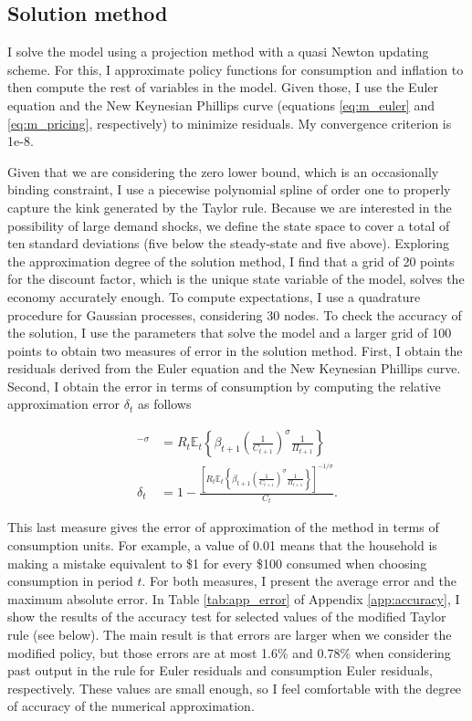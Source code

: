 \documentclass[12pt]{article}
\numberwithin{equation}{section}
\begin{document}


\subsection{Solution method}

I solve the model using a projection method with a quasi Newton updating scheme. For this, I approximate policy functions for consumption and inflation to then compute the rest of variables in the model. Given those, I use the Euler equation and the New Keynesian Phillips curve (equations \ref{eq:m_euler} and \ref{eq:m_pricing}, respectively) to minimize residuals. My convergence criterion is 1e-8.

Given that we are considering the zero lower bound, which is an occasionally binding constraint, I use a piecewise polynomial spline of order one to properly capture the kink generated by the Taylor rule. Because we are interested in the possibility of large demand shocks, we define the state space to cover a total of ten standard deviations (five below the steady-state and five above). Exploring the approximation degree of the solution method, I find that a grid of 20 points for the discount factor, which is the unique state variable of the model, solves the economy accurately enough. To compute expectations, I use a quadrature procedure for Gaussian processes, considering 30 nodes. To check the accuracy of the solution, I use the parameters that solve the model and a larger grid of 100 points to obtain two measures of error in the solution method. First, I obtain the residuals derived from the Euler equation and the New Keynesian Phillips curve. Second, I obtain the error in terms of consumption by computing the relative approximation error $\delta_t$ as follows

\begin{align*}
	[C_t(1-\delta_t)]^{-\sigma}&=R_t\mathbb{E}_t\left\{\beta_{t+1}\left(\frac{1}{C_{t+1}}\right)^{\sigma}\frac{1}{\Pi_{t+1}}\right\}\\
	\delta_t&=1-\frac{\left[R_t\mathbb{E}_t\left\{\beta_{t+1}\left(\frac{1}{C_{t+1}}\right)^{\sigma}\frac{1}{\Pi_{t+1}}\right\}\right]^{-1/\sigma}}{C_t}.
\end{align*}

This last measure gives the error of approximation of the method in terms of consumption units. For example, a value of 0.01 means that the household is making a mistake equivalent to \$1 for every \$100 consumed when choosing consumption in period $t$. For both measures, I present the average error and the maximum absolute error. In Table \ref{tab:app_error} of Appendix \ref{app:accuracy}, I show the results of the accuracy test for selected values of the modified Taylor rule (see below). The main result is that errors are larger when we consider the modified policy, but those errors are at most 1.6\% and 0.78\% when considering past output in the rule for Euler residuals and consumption Euler residuals, respectively. These values are small enough, so I feel comfortable with the degree of accuracy of the numerical approximation.
\end{document}
